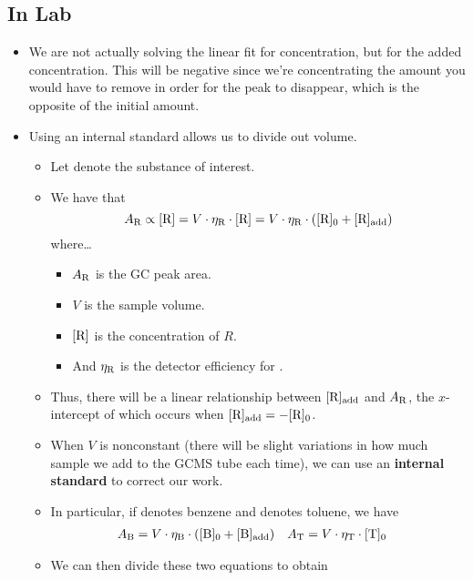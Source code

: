 \documentclass[../notes.tex]{subfiles}
\begin{document}
\subsection*{In Lab}
\begin{itemize}
    \item We are not actually solving the linear fit for concentration, but for the added concentration. This will be negative since we're concentrating the amount you would have to remove in order for the peak to disappear, which is the opposite of the initial amount.
    \item Using an internal standard allows us to divide out volume.
    \begin{itemize}
        \item Let  denote the substance of interest.
        \item We have that
        \begin{equation*}
            A_{\ce{R}} \propto [\ce{R}]
            = V\cdot\eta_{\ce{R}}\cdot[\ce{R}]
            = V\cdot\eta_{\ce{R}}\cdot([\ce{R}]_0+[\ce{R}]_\text{add})
        \end{equation*}
        where\dots
        \begin{itemize}
            \item $A_{\ce{R}}$ is the GC peak area.
            \item $V$ is the sample volume.
            \item $[\ce{R}]$ is the concentration of $R$.
            \item And $\eta_{\ce{R}}$ is the detector efficiency for .
        \end{itemize}
        \item Thus, there will be a linear relationship between $[\ce{R}]_\text{add}$ and $A_{\ce{R}}$, the $x$-intercept of which occurs when $[\ce{R}]_\text{add}=-[\ce{R}]_0$.
        \item When $V$ is nonconstant (there will be slight variations in how much sample we add to the GCMS tube each time), we can use an \textbf{internal standard} to correct our work.
        \item In particular, if  denotes benzene and  denotes toluene, we have
        \begin{align*}
            A_{\ce{B}} &= V\cdot\eta_{\ce{B}}\cdot([\ce{B}]_0+[\ce{B}]_\text{add})&
            A_{\ce{T}} &= V\cdot\eta_{\ce{T}}\cdot[\ce{T}]_0
        \end{align*}
        \item We can then divide these two equations to obtain

\end{itemize}
\end{itemize}
\end{document}

